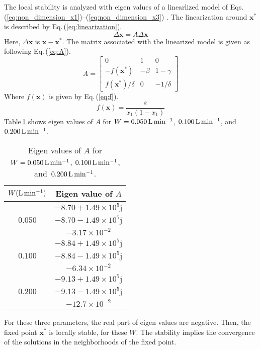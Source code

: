 \documentclass[a4paper]{article}
\newcommand{\tabref}[1]{Table\,\ref{#1}}
\renewcommand{\eqref}[1]{Eq.\,(\ref{#1})}
\newcommand{\eqshref}[2]{Eqs.\,(\ref{#1})--(\ref{#2})}
\newcommand{\order}[1]{\times10^{#1}}
\newcommand{\fr}{{\rm L\,min^{-1}}}
\newcommand{\D}[1]{\Delta{#1}}
\begin{document}
The local stability is analyzed with eigen values of a linearlized model of \eqshref{eq:non_dimension_x1}{eq:non_dimension_x3} \cite{wiggins-introduction-eigen-value}. 
The linearization around ${\bm x^*}$ is described by \eqref{eq:linearization}. 
\begin{equation}
 \D {\bm x}=A \D{\bm x}\label{eq:linearization}
\end{equation}
Here, $\D {\bm x}$ is ${\bm x}-{\bm x^{\ast}}$. 
The matrix associated with the linearized model is given as following \eqref{eq:A}. 
\begin{equation}
 A=\left[
    \begin{array}{ccc}
     0 & 1 & 0\\
     -f({\bm x^{\ast}}) & -\beta & 1-\gamma\\
     f({\bm x^{\ast}})/\delta & 0 & -1/\delta
    \end{array}
   \right] \label{eq:A}
\end{equation}
Where $f({\bm x})$ is given by \eqref{eq:f}. 
\begin{equation}
 f({\bm x})=\frac{\varepsilon}{x_1(1-x_1)}\label{eq:f}
\end{equation}
\tabref{tab:eigen_value} shows eigen values of $A$ for $W=0.050\,\fr$, $0.100\,\fr$, and $0.200\,\fr$.
\begin{table}[h]
 \begin{center}
  \caption{Eigen values of $A$ for $W=0.050\,\fr$, $0.100\,\fr$, and $\,0.200\,\fr$.}
  \begin{tabular}{|c|c|}\hline\label{tab:eigen_value}
   $W(\fr)$&Eigen value of $A$\\\hline
   &$-8.70+1.49\order{5}\mathrm{j}$\\
   $0.050$&$-8.70-1.49\times10^5\mathrm{j}$\\
   &$-3.17\times10^{-2}$\\\hline
   &$-8.84+1.49\order{5}\mathrm{j}$\\
   $0.100$&$-8.84-1.49\times10^5\mathrm{j}$\\
   &$-6.34\times10^{-2}$\\\hline
   &$-9.13+1.49\order{5}\mathrm{j}$\\
   $0.200$&$-9.13-1.49\times10^5\mathrm{j}$\\
   &$-12.7\times10^{-2}$\\ \hline
  \end{tabular}
 \end{center}
\end{table}
For these three parameters, the real part of eigen values are negative. 
Then, the fixed point ${\bm x}^{\ast}$ is locally stable, for these $W$. 
The stability implies the convergence of the solutions in the neighborhoods of the fixed point. 
\end{document}
